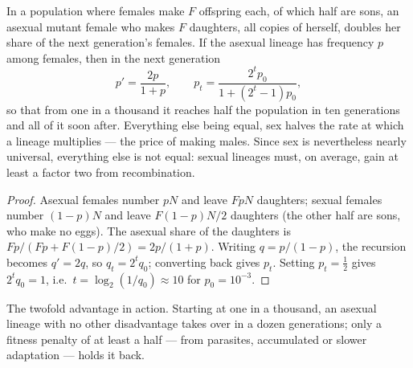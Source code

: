 \begin{theorem}\label{thm:b2:asexual-reproduction:twofold}
In a population where females make $F$ offspring each, of which half
are sons, an asexual mutant female who makes $F$ daughters, all
copies of herself, doubles her share of the next generation's
females. If the asexual lineage has frequency $p$ among females,
then in the next generation
\[
p' = \frac{2p}{1 + p}, \qquad p_t = \frac{2^t p_0}{1 + (2^t - 1)p_0},
\]
so that from one in a thousand it reaches half the population in
ten generations and all of it soon after. Everything else being
equal, sex halves the rate at which a lineage multiplies --- the
price of making males. Since sex is nevertheless nearly universal,
everything else is not equal: sexual lineages must, on average, gain
at least a factor two from recombination.
\end{theorem}
\begin{proof}
Asexual females number $pN$ and leave $FpN$ daughters; sexual
females number $(1 - p)N$ and leave $F(1 - p)N/2$ daughters (the
other half are sons, who make no eggs). The asexual share of the
daughters is $Fp/(Fp + F(1 - p)/2) = 2p/(1 + p)$. Writing $q = p/(1 -
p)$, the recursion becomes $q' = 2q$, so $q_t = 2^t q_0$; converting
back gives $p_t$. Setting $p_t = \tfrac12$ gives $2^t q_0 = 1$, i.e.\
$t = \log_2(1/q_0) \approx 10$ for $p_0 = 10^{-3}$.
\end{proof}

\begin{omfigure}

{\small The twofold advantage in action. Starting at one in a
thousand, an asexual lineage with no other disadvantage takes over
in a dozen generations; only a fitness penalty of at least a half
--- from parasites, accumulated  or slower adaptation ---
holds it back.}
\end{omfigure}

